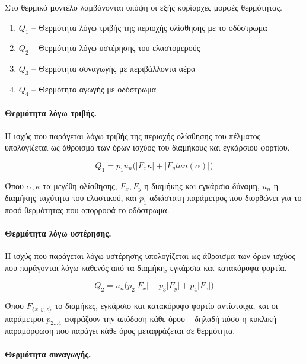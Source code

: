 Στο θερμικό μοντέλο λαμβάνονται υπόψη οι εξής κυρίαρχες μορφές θερμότητας.

\begin{enumerate}
    \item $Q_1$ -- Θερμότητα λόγω τριβής της περιοχής ολίσθησης με το οδόστρωμα
    \item $Q_2$ -- Θερμότητα λόγω υστέρησης του ελαστομερούς
    \item $Q_3$ -- Θερμότητα συναγωγής με περιβάλλοντα αέρα
    \item $Q_4$ -- Θερμότητα αγωγής με οδόστρωμα
\end{enumerate}

\paragraph{Θερμότητα λόγω τριβής.}

Η ισχύς που παράγεται λόγω τριβής της περιοχής ολίσθησης του πέλματος υπολογίζεται ως
άθροισμα των όρων ισχύος του διαμήκους και εγκάρσιου φορτίου.

\begin{equation}
    Q_1 = p_1u_n\bigl(\lvert F_x\kappa\rvert + \lvert F_ytan(\alpha)\rvert\bigr)
    \label{eq:Q1}
\end{equation}

Όπου $\alpha,\kappa$ τα μεγέθη ολίσθησης, $F_x, F_y$ 
η διαμήκης και εγκάρσια δύναμη, $u_n$ η διαμήκης ταχύτητα του ελαστικού, 
και $p_1$ αδιάστατη παράμετρος που διορθώνει για το ποσό θερμότητας που απορροφά
το οδόστρωμα.

\paragraph{Θερμότητα λόγω υστέρησης.}

Η ισχύς που παράγεται λόγω υστέρησης υπολογίζεται ως
άθροισμα των όρων ισχύος που παράγονται λόγω καθενός από τα διαμήκη, εγκάρσια και κατακόρυφα φορτία.

\begin{equation}
    Q_2 = u_n\bigl(p_2\lvert F_x \rvert
    + p_3\lvert F_y \rvert
    + p_4\lvert F_z \rvert
    \bigr)
    \label{eq:Q2}
\end{equation}

Όπου $F_{\{x,y,z\}}$ το διαμήκες, εγκάρσιο και κατακόρυφο φορτίο αντίστοιχα,
και οι παράμετροι $p_{2\dots4}$ εκφράζουν την απόδοση κάθε όρου -- δηλαδή
πόσο η κυκλική παραμόρφωση που παράγει κάθε όρος μεταφράζεται σε θερμότητα.
\paragraph{Θερμότητα συναγωγής.}

